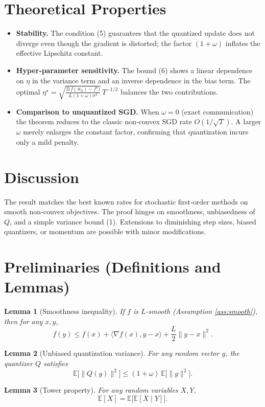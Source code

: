 \documentclass{article}
\newtheorem{lemma}{Lemma}
\newcommand{\E}{\mathbb{E}}
\begin{document}
\section*{Theoretical Properties}
\begin{itemize}[leftmargin=*]
\item \textbf{Stability.} The condition (5) guarantees that the
quantized update does not diverge even though the gradient is distorted;
the factor $(1+\omega)$ inflates the effective Lipschitz constant.
\item \textbf{Hyper‑parameter sensitivity.}
The bound (6) shows a linear dependence on $\eta$ in the variance term and an
inverse dependence in the bias term.  The optimal $\eta^{\star}
=\sqrt{\frac{2\big(f(w_{0})-f^{\star}\big)}{L(1+\omega)\sigma^{2}}}\,T^{-1/2}$
balances the two contributions.
\item \textbf{Comparison to unquantized SGD.}
When $\omega=0$ (exact communication) the theorem reduces to the classic
non‑convex SGD rate $O(1/\sqrt{T})$.  A larger $\omega$ merely enlarges the
constant factor, confirming that quantization incurs only a mild penalty.
\end{itemize}

\section*{Discussion}
The result matches the best known rates for stochastic first‑order methods on
smooth non‑convex objectives.  The proof hinges on smoothness, unbiasedness of
$Q$, and a simple variance bound (1).  Extensions to diminishing step sizes,
biased quantizers, or momentum are possible with minor modifications.

\newpage
\section*{Preliminaries (Definitions and Lemmas)}
\begin{lemma}[Smoothness inequality]\label{lem:smooth}
If $f$ is $L$‑smooth (Assumption \ref{ass:smooth}), then for any $x,y$,
\[
f(y)\le f(x)+\langle\nabla f(x),y-x\rangle+\frac{L}{2}\|y-x\|^{2}.
\]
\end{lemma}
\begin{lemma}[Unbiased quantization variance]\label{lem:quant}
For any random vector $g$, the quantizer $Q$ satisfies
\[
\E\!\big[\|Q(g)\|^{2}\big]\le (1+\omega)\,\E\!\big[\|g\|^{2}\big].
\]
\end{lemma}
\begin{lemma}[Tower property]\label{lem:tower}
For any random variables $X,Y$,
\[
\E[X]=\E\big[\E[X\mid Y]\big].
\]
\end{lemma}
\end{document}
